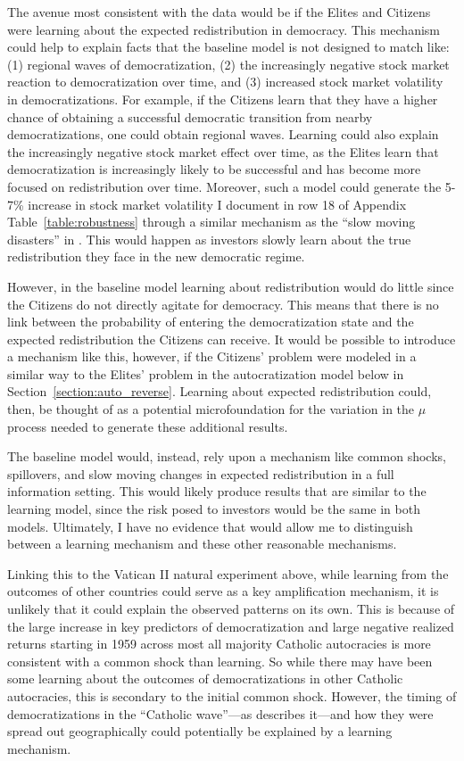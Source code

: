 The avenue most consistent with the data would be if the Elites and Citizens were learning about the expected redistribution in democracy.  This mechanism could help to explain facts that the baseline model is not designed to match like: (1) regional waves of democratization, (2) the increasingly negative stock market reaction to democratization over time, and (3) increased stock market volatility in democratizations. For example, if the Citizens learn that they have a higher chance of obtaining a successful democratic transition from nearby democratizations, one could obtain regional waves. Learning could also explain the increasingly negative stock market effect over time, as the Elites learn that democratization is increasingly likely to be successful and has become more focused on redistribution over time. Moreover, such a model could generate the 5-7\% increase in stock market volatility I document in row 18 of Appendix Table~\ref{table:robustness} through a similar mechanism as the ``slow moving disasters'' in \cite*{Ghaderi2022}. This would happen as investors slowly learn about the true redistribution they face in the new democratic regime.

However, in the baseline model learning about redistribution would do little since the Citizens do not directly agitate for democracy. This means that there is no link between the probability of entering the democratization state and the expected redistribution the Citizens can receive.  It would be possible to introduce a mechanism like this, however, if the Citizens' problem were modeled in a similar way to the Elites' problem in the autocratization model below in Section~\ref{section:auto_reverse}. Learning about expected redistribution could, then, be thought of as a potential microfoundation for the variation in the $\mu$ process needed to generate these additional results.

The baseline model would, instead, rely upon a mechanism like common shocks, spillovers, and slow moving changes in expected redistribution in a full information setting.  This would likely produce results that are similar to the learning model, since the risk posed to investors would be the same in both models. Ultimately,  I have no evidence that would allow me to distinguish between a learning mechanism and these other reasonable mechanisms.

Linking this to the Vatican II natural experiment above, while learning from the outcomes of other countries could serve as a key amplification mechanism, it is unlikely that it could explain the observed patterns on its own. This is because of the large increase in key predictors of democratization and large negative realized returns starting in 1959 across most all majority Catholic autocracies is more consistent with a common shock than learning. So while there may have been some learning about the outcomes of democratizations in other Catholic autocracies, this is secondary to the initial common shock.  However, the timing of democratizations in the ``Catholic wave''---as \cite{Philpott2004} describes it---and how they were spread out geographically could potentially be explained by a learning mechanism.

